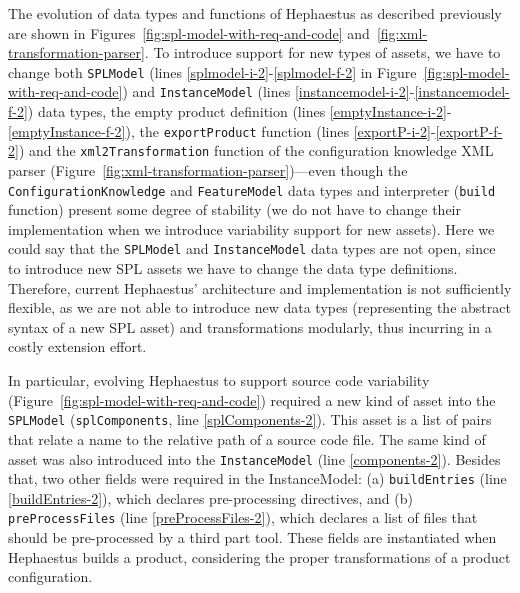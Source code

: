 The evolution of data types and functions of Hephaestus as described previously are shown in 
Figures~\ref{fig:spl-model-with-req-and-code} and~\ref{fig:xml-transformation-parser}. To introduce support for new types of assets, we
have to change both \texttt{SPLModel} (lines \ref{splmodel-i-2}-\ref{splmodel-f-2} in Figure~\ref{fig:spl-model-with-req-and-code}) and \texttt{InstanceModel}
(lines \ref{instancemodel-i-2}-\ref{instancemodel-f-2})
data types, the empty product definition (lines \ref{emptyInstance-i-2}-\ref{emptyInstance-f-2}),
the \texttt{exportProduct} function  (lines \ref{exportP-i-2}-\ref{exportP-f-2}) and 
the \texttt{xml2Transformation} function of the configuration knowledge XML parser (Figure~\ref{fig:xml-transformation-parser})---even though the \texttt{ConfigurationKnowledge} and \texttt{FeatureModel} data types and 
interpreter (\texttt{build} function) present some degree of stability
(we do not have to change their implementation when we introduce variability support for
new assets). Here we could say that the \texttt{SPLModel} and
\texttt{InstanceModel} data types are not open, since to introduce new SPL assets
we have to change the data type definitions. Therefore, current Hephaestus' architecture and implementation is not sufficiently flexible, as we are not able to
introduce new data types (representing the abstract syntax of a new SPL asset) and transformations modularly, thus incurring in a costly extension effort.



In particular, evolving Hephaestus to support source code variability (Figure~\ref{fig:spl-model-with-req-and-code}) required
a new kind of asset into the \texttt{SPLModel}
(\texttt{splComponents}, line \ref{splComponents-2}). This asset is a list of pairs that relate a name to the
relative path of a source code file. The same kind of asset was also
introduced into the \texttt{InstanceModel} (line  \ref{components-2}). Besides that, two other fields were required in the InstanceModel:
(a) \texttt{buildEntries} (line  \ref{buildEntries-2}), which declares pre-processing directives, and
(b) \texttt{preProcessFiles} (line \ref{preProcessFiles-2}), which declares a list of files that should
be pre-processed by a third part tool. These fields are instantiated
when Hephaestus builds a product, considering
the proper transformations of a product configuration.


